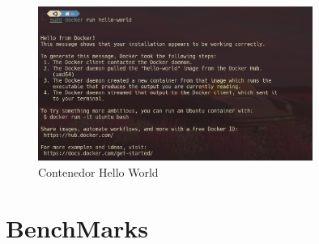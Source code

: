 \begin{figure}[H]
    \centering
    \includegraphics[width=0.8\textwidth]{images/Bloque2/hello-world.png}
    \caption{Contenedor Hello World}
    \label{fig:hello-world}
\end{figure}

\section{BenchMarks}






